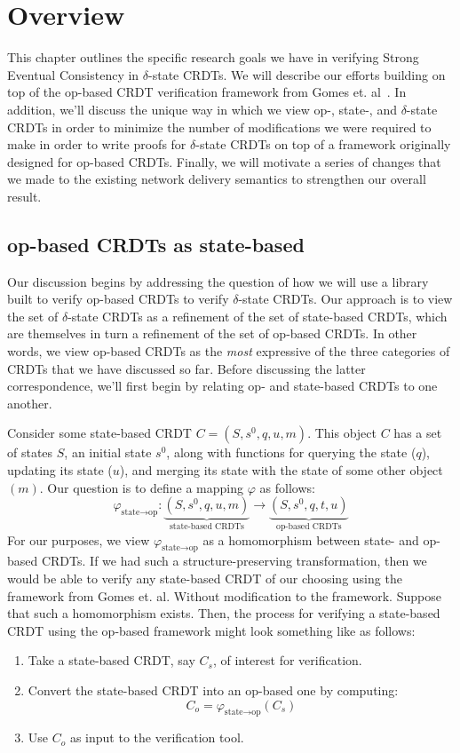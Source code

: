 \chapter{Overview}
\label{chap:overview}

This chapter outlines the specific research goals we have in verifying Strong
Eventual Consistency in $\delta$-state CRDTs. We will describe our efforts
building on top of the op-based CRDT verification framework from Gomes et.
al~\citep{gomes17}. In addition, we'll discuss the unique way in which we view
op-, state-, and $\delta$-state CRDTs in order to minimize the number of
modifications we were required to make in order to write proofs for
$\delta$-state CRDTs on top of a framework originally designed for op-based
CRDTs. Finally, we will motivate a series of changes that we made to the
existing network delivery semantics to strengthen our overall result.

\section{op-based CRDTs as state-based}
Our discussion begins by addressing the question of how we will use a library
built to verify op-based CRDTs to verify $\delta$-state CRDTs. Our approach is
to view the set of $\delta$-state CRDTs as a refinement of the set of
state-based CRDTs, which are themselves in turn a refinement of the set of
op-based CRDTs. In other words, we view op-based CRDTs as the \emph{most}
expressive of the three categories of CRDTs that we have discussed so far.
Before discussing the latter correspondence, we'll first begin by relating op-
and state-based CRDTs to one another.

Consider some state-based CRDT $C = (S, s^0, q, u, m)$. This object $C$ has a
set of states $S$, an initial state $s^0$, along with functions for querying the
state ($q$), updating its state ($u$), and merging its state with the state of
some other object $(m)$. Our question is to define a mapping $\varphi$ as
follows:
\[
  \varphi_{\text{state} \to \text{op}} :
    \underbrace{(S, s^0, q, u, m)}_{\text{state-based CRDTs}} \longrightarrow
    \underbrace{(S, s^0, q, t, u)}_{\text{op-based CRDTs}}
\]
For our purposes, we view $\varphi_{\text{state} \to \text{op}}$ as a homomorphism
between state- and op-based CRDTs. If we had such a structure-preserving
transformation, then we would be able to verify any state-based CRDT of our
choosing using the framework from Gomes et. al. Without modification to the
framework. Suppose that such a homomorphism exists. Then, the process for
verifying a state-based CRDT using the op-based framework might look something
like as follows:
\begin{enumerate}
  \item Take a state-based CRDT, say $C_s$, of interest for verification.
  \item Convert the state-based CRDT into an op-based one by computing:
    \[
      C_o = \varphi_{\text{state} \to \text{op}}(C_s)
    \]
  \item Use $C_o$ as input to the verification tool.
\end{enumerate}

